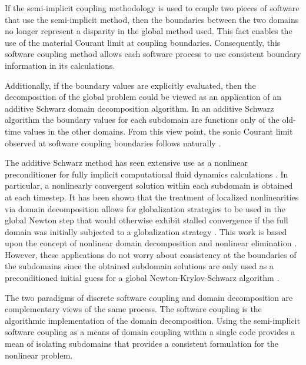 If the semi-implicit coupling methodology is used to couple two pieces of software that use the semi-implicit method, then the boundaries between the two domains no longer represent a disparity in the global method used.
This fact enables the use of the material Courant limit at coupling boundaries.
Consequently, this software coupling method allows each software process to use consistent boundary information in its calculations.

Additionally, if the boundary values are explicitly evaluated, then the decomposition of the global problem could be viewed as an application of an additive Schwarz domain decomposition algorithm.
In an additive Schwarz algorithm the boundary values for each subdomain are functions only of the old-time values in the other domains.
From this view point, the sonic Courant limit observed at software coupling boundaries follows naturally \cite{Aumiller2001}.

The additive Schwarz method has seen extensive use as a nonlinear preconditioner for fully implicit computational fluid dynamics calculations \cite{Cai2009, Cai2002}.
In particular, a nonlinearly convergent solution within each subdomain is obtained at each timestep.
It has been shown that the treatment of localized nonlinearities via domain decomposition allows for globalization strategies to be used in the global Newton step that would otherwise exhibit stalled convergence if the full domain was initially subjected to a globalization strategy \cite{Cai2011}.
This work is based upon the concept of nonlinear domain decomposition and nonlinear elimination \cite{Lanzkron1996, Dryja1997}.
However, these applications do not worry about consistency at the boundaries of the subdomains since the obtained subdomain solutions are only used as a preconditioned initial guess for a global Newton-Krylov-Schwarz algorithm \cite{Chan1984}.

The two paradigms of discrete software coupling and domain decomposition are complementary views of the same process.
The software coupling is the algorithmic implementation of the domain decomposition.
Using the semi-implicit software coupling as a means of domain coupling within a single code provides a mean of isolating subdomains that provides a consistent formulation for the nonlinear problem.